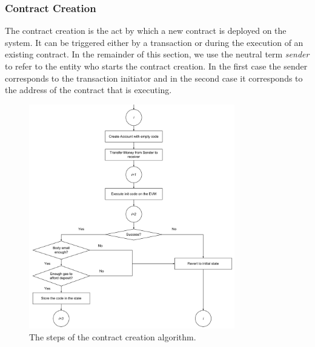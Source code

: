 \subsubsection{Contract Creation}
\label{sec:contract-creation}

The contract creation is the act by which a new contract is deployed on the
system. It can be triggered either by a transaction or during the execution of
an existing contract. In the remainder of this section, we use the neutral term
\textit{sender} to refer to the entity who starts the contract creation. In the
first case the sender corresponds to the transaction initiator and in the second
case it corresponds to the address of the contract that is executing.

\begin{figure}[h!]
	\begin{center}
		\includegraphics[width=0.8\textwidth]{./res/img/contract-creation.pdf}
	\end{center}
	\caption{The steps of the contract creation algorithm.}
	\label{fig:contract-creation}
\end{figure}

